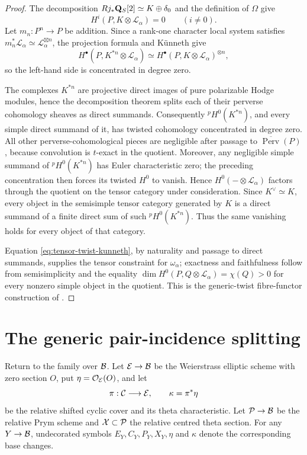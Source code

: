 \begin{proof}
The decomposition
$Rj_*\mathbf Q_S[2]\simeq K\oplus\delta_0$ and the definition of $\Omega$ give
\[
 H^i(P,K\otimes\mathcal L_\alpha)=0\qquad(i\ne0).
\]
Let $m_n:P^n\to P$ be addition.  Since a rank-one character local system
satisfies
$m_n^*\mathcal L_\alpha\simeq\mathcal L_\alpha^{\boxtimes n}$, the
projection formula and K\"unneth give
\begin{equation}
 H^\bullet(P,K^{*n}\otimes\mathcal L_\alpha)
 \simeq
 H^\bullet(P,K\otimes\mathcal L_\alpha)^{\otimes n},
\label{eq:tensor-twist-kunneth}
\end{equation}
so the left-hand side is concentrated in degree zero.

The complexes $K^{*n}$ are projective direct images of pure polarizable
Hodge modules, hence the decomposition theorem splits each of their perverse
cohomology sheaves as direct summands.  Consequently
${}^pH^0(K^{*n})$, and every simple direct summand of it, has twisted
cohomology concentrated in degree zero.  All other perverse-cohomological
pieces are negligible after passage to
$\overline{\operatorname{Perv}}(P)$, because convolution is $t$-exact in
the quotient.  Moreover, any negligible simple summand of
${}^pH^0(K^{*n})$ has Euler characteristic zero; the preceding concentration
then forces its twisted $H^0$ to vanish.  Hence $H^0(-\otimes\mathcal
L_\alpha)$ factors through the quotient on the tensor category under
consideration.  Since $K^\vee\simeq K$, every object in the semisimple tensor
category generated by $K$ is a direct summand of a finite direct sum of such
${}^pH^0(K^{*n})$.  Thus the same vanishing holds for every object of that
category.

Equation \eqref{eq:tensor-twist-kunneth}, by naturality and passage to direct
summands, supplies the tensor constraint for $\omega_\alpha$; exactness and
faithfulness follow from semisimplicity and the equality
$\dim H^0(P,Q\otimes\mathcal L_\alpha)=\chi(Q)>0$ for every nonzero simple
object in the quotient.  This is the generic-twist fibre-functor
construction of \cite[Section~3.1, Proposition~3.1]{KLM2026}.
\end{proof}


\section{The generic pair-incidence splitting}\label{sec:pair-splitting}

Return to the family over $\mathcal B$.  Let $\mathcal E\to\mathcal B$ be the Weierstrass elliptic
scheme with zero section $O$, put $\eta=\mathcal O_{\mathcal E}(O)$, and let
\[
 \pi:\mathcal C\longrightarrow\mathcal E,
 \qquad
 \kappa=\pi^*\eta
\]
be the relative shifted cyclic cover and its theta characteristic.  Let
$\mathcal P\to\mathcal B$ be the relative Prym scheme and $\mathcal X\subset\mathcal P$ the relative
centred theta section.  For any $Y\to\mathcal B$, undecorated symbols
$E_Y,C_Y,P_Y,X_Y,\eta$ and $\kappa$ denote the corresponding base changes.

